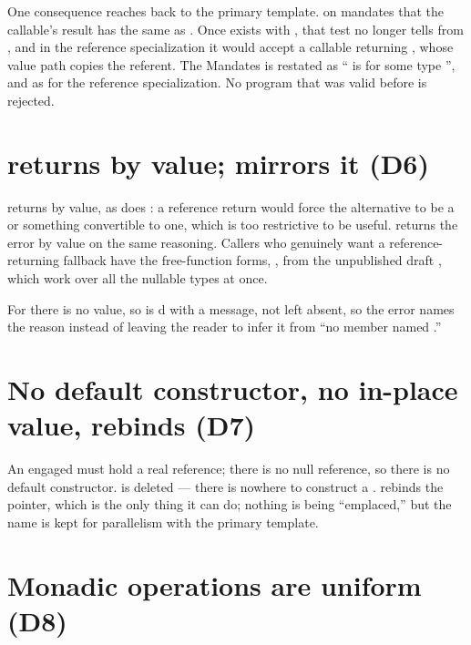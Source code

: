 \documentclass[a4paper,10pt,oneside,openany,final,article]{memoir}
\begin{document}
One consequence reaches back to the primary template.  on
 mandates that the callable's result  has
 the same as . Once  exists
with  , that test no longer tells
 from , and in the reference
specialization it would accept a callable returning ,
whose value path copies the referent. The Mandates is restated as ``
is  for some type '', and as
 for the reference specialization. No program that
was valid before is rejected.

\section{ returns by value;  mirrors it (D6)}

 returns  by value, as
 does \cite{P2988R12}: a reference return would
force the alternative to be a  or something convertible to one, which
is too restrictive to be useful.  returns the error by value on
the same reasoning. Callers who genuinely want a reference-returning fallback
have the free-function forms, , from the unpublished draft
\cite{D4270R0}, which work over all the nullable types at once.

For  there is no value, so  is
d with a message, not left absent, so the error names
the reason instead of leaving the reader to infer it from ``no member named
.''

\section{No default constructor, no in-place value,  rebinds (D7)}

An engaged  must hold a real reference; there is no null
reference, so there is no default constructor. 
is deleted --- there is nowhere to construct a . 
rebinds the pointer, which is the only thing it can do; nothing is being
``emplaced,'' but the name is kept for parallelism with the primary template.

\section{Monadic operations are uniform (D8)}
\end{document}
